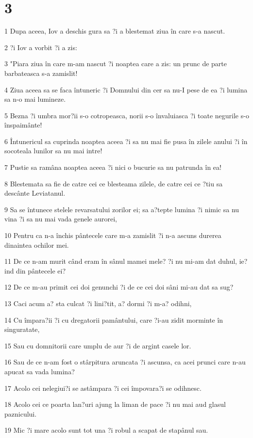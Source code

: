 \chapter{3}

\par 1 Dupa aceea, Iov a deschis gura sa ?i a blestemat ziua în care s-a nascut.
\par 2 ?i Iov a vorbit ?i a zis:
\par 3 "Piara ziua în care m-am nascut ?i noaptea care a zis: un prunc de parte barbateasca s-a zamislit!
\par 4 Ziua aceea sa se faca întuneric ?i Domnului din cer sa nu-I pese de ea ?i lumina sa n-o mai lumineze.
\par 5 Bezna ?i umbra mor?ii s-o cotropeasca, norii s-o învaluiasca ?i toate negurile s-o înspaimânte!
\par 6 Întunericul sa cuprinda noaptea aceea ?i sa nu mai fie pusa în zilele anului ?i în socoteala lunilor sa nu mai intre!
\par 7 Pustie sa ramâna noaptea aceea ?i nici o bucurie sa nu patrunda în ea!
\par 8 Blestemata sa fie de catre cei ce blesteama zilele, de catre cei ce ?tiu sa descânte Leviatanul.
\par 9 Sa se întunece stelele revarsatului zorilor ei; sa a?tepte lumina ?i nimic sa nu vina ?i sa nu mai vada genele aurorei,
\par 10 Pentru ca n-a închis pântecele care m-a zamislit ?i n-a ascuns durerea dinaintea ochilor mei.
\par 11 De ce n-am murit când eram în sânul mamei mele? ?i nu mi-am dat duhul, ie?ind din pântecele ei?
\par 12 De ce m-au primit cei doi genunchi ?i de ce cei doi sâni mi-au dat sa sug?
\par 13 Caci acum a? sta culcat ?i lini?tit, a? dormi ?i m-a? odihni,
\par 14 Cu împara?ii ?i cu dregatorii pamântului, care ?i-au zidit morminte în singuratate,
\par 15 Sau cu domnitorii care umplu de aur ?i de argint casele lor.
\par 16 Sau de ce n-am fost o stârpitura aruncata ?i ascunsa, ca acei prunci care n-au apucat sa vada lumina?
\par 17 Acolo cei nelegiui?i se astâmpara ?i cei împovara?i se odihnesc.
\par 18 Acolo cei ce poarta lan?uri ajung la liman de pace ?i nu mai aud glasul paznicului.
\par 19 Mic ?i mare acolo sunt tot una ?i robul a scapat de stapânul sau.
